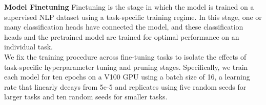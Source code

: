 \textbf{Model Finetuning}
Finetuning is the stage in which the model is trained on a supervised NLP dataset using a task-specific training regime. In this stage, one or many classification heads have connected the model, and these classification heads and the pretrained model are trained for optimal performance on an individual task.\\
We fix the training procedure across fine-tuning tasks to isolate the effects of task-specific hyperparameter tuning and pruning stages. Specifically, we train each model for ten epochs on a V100 GPU using a batch size of 16, a learning rate that linearly decays from 5e-5 and replicates using five random seeds for larger tasks and ten random seeds for smaller tasks. \\
\begin{table*}[htb!]
    \centering
    \caption{Overall results on the impact of task and dataset of model pruning. Models trained for the general domain and pruned on the general domain can transfer at equal or better accuracy. Question Answering is the notable outlier as its small dataset size benefits from the sparse models as their pruned architecture prevents overfitting on small datasets.}
    \label{tab:full_datasets}
    \vspace{-1.2em}
\end{table*}
